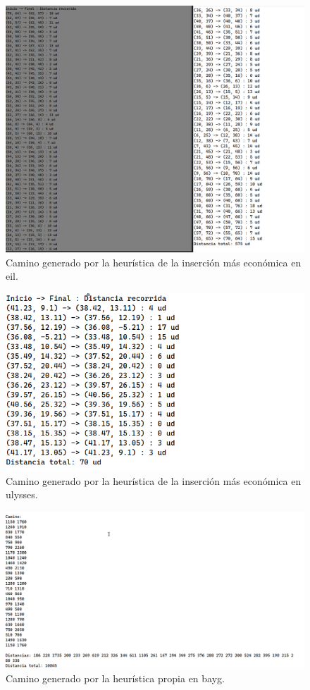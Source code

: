\begin{figure}[H]
  \centering
  \includegraphics[scale=0.5]{img/dist-insercion-eil.png}
  \caption{Camino generado por la heurística de la inserción más económica en eil.}
\end{figure}

\begin{figure}[H]
  \centering
  \includegraphics[scale=0.5]{img/dist-insercion-ulysses.png}
  \caption{Camino generado por la heurística de la inserción más económica en ulysses.}
\end{figure}

\begin{figure}[H]
  \centering
  \includegraphics[scale=0.5]{img/dist-kr-bayg.png}
  \caption{Camino generado por la heurística propia en bayg.}
\end{figure}


